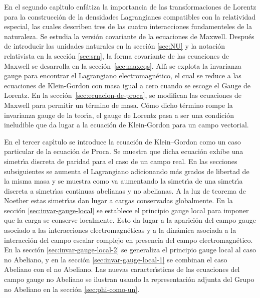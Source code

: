 En el segundo cap\'\i tulo enfátiza la importancia de las transformaciones de Lorentz para la construcción de la densidades Lagrangianes compatibles con la relatividad especial, las cuales describen tres de las cuatro interacciones fundamenteles de la naturaleza.
Se estudia la versi\'on covariante de la ecuaciones de Maxwell. Despu\'es de introducir las unidades naturales en la secci\'on \ref{sec:NU} y la notaci\'on relativista en la secci\'on \ref{sec:srn}, la forma covariante de las ecuaciones de Maxwell se desarrolla en la secci\'on~\ref{sec:maxeqs}. All\'\i{} se explota la invarianza gauge para encontrar el Lagrangiano electromagn\'etico, el cual se reduce a las ecuaciones de Klein-Gordon con masa igual a cero cuando se escoge el Gauge de Lorentz. En la secci\'on~\ref{sec:ecuacion-de-proca}, se modifican las ecuaciones de Maxwell para permitir un t\'ermino de masa. C\'omo dicho t\'ermino rompe la invarianza gauge de la teor\'\i a, el gauge de Lorentz pasa a ser una condici\'on ineludible que da lugar a la ecuaci\'on de Klein-Gordon para un campo vectorial.

En el tercer cap\'\i tulo se introduce la ecuaci\'on de Klein--Gordon como un caso particular de la ecuaci\'on de Proca. Se muestra que dicha ecuaci\'on exhibe una simetr\'\i a discreta de paridad para el caso de un campo real. En las secciones subsiguientes se aumenta el Lagrangiano adicionando m\'as grados de libertad de la misma masa y se muestra como va aumentando la simetr\'\i a de una simetr\'\i a discreta a simetr\'\i as continuas abelianas y no abelianas. A la luz de teorema de Noether estas simetr\'\i as dan lugar a cargas conservadas globalmente. En la secci\'on \ref{sec:invar-gauge-local} se establece el principio gauge local para imponer que la carga se conserve localmente. Esto da lugar a la aparici\'on del campo gauge asociado a las interacciones electromagn\'eticas y a la din\'amica asociada a la interacci\'on del campo escalar complejo en presencia del campo electromagn\'etico. En la secci\'on \ref{sec:invar-gauge-local-2} se generaliza el principio gauge local al caso no Abeliano, y en la secci\'on \ref{sec:invar-gauge-local-1} se combinan el caso Abeliano con el no Abeliano. Las nuevas caracter\'\i sticas de las ecuaciones del campo gauge no Abeliano se ilustran usando la representaci\'on adjunta del Grupo no Abeliano en la secci\'on \ref{sec:phi-como-un}.

